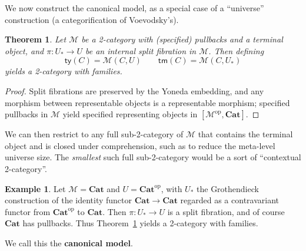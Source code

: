 \documentclass[10pt]{article}
\newtheorem{theorem}{Theorem}
\theoremstyle{definition}
\newtheorem{example}{Example}
\newcommand\op{^{\mathrm{op}}}
\newcommand\Cat{\mathbf{Cat}}
\newcommand\M{\mathcal{M}}
\newcommand\Mty{\mathsf{ty}}
\newcommand\Mtm{\mathsf{tm}}
\newcommand\Un{U}
\newcommand\Ub{U_*}
\begin{document}
We now construct the canonical model, as a special case of a ``universe'' construction (a categorification of Voevodsky's).

\begin{theorem}\label{thm:2cwf-univ}
  Let $\M$ be a 2-category with (specified) pullbacks and a terminal object, and $\pi:\Ub\to\Un$ be an internal split fibration in $\M$.
  Then defining
  \[ \Mty(C) = \M(C,\Un) \qquad \Mtm(C) = \M(C,\Ub) \]
  yields a 2-category with families.
\end{theorem}
\begin{proof}
  Split fibrations are preserved by the Yoneda embedding, and any morphism between representable objects is a representable morphism; specified pullbacks in $\M$ yield specified representing objects in $[\M\op,\Cat]$.
\end{proof}

We can then restrict to any full sub-2-category of $\M$ that contains the terminal object and is closed under comprehension, such as to reduce the meta-level universe size.
The \emph{smallest} such full sub-2-category would be a sort of ``contextual 2-category''.

\begin{example}\label{eg:canon-2cwf}
  Let $\M =\Cat$ and $\Un= \Cat\op$, with $\Ub$ the Grothendieck construction of the identity functor $\Cat \to \Cat$ regarded as a contravariant functor from $\Cat\op$ to $\Cat$.
  Then $\pi:\Ub\to\Un$ is a split fibration, and of course $\Cat$ has pullbacks.
  Thus Theorem~\ref{thm:2cwf-univ} yields a 2-category with families.


  We call this the \textbf{canonical model}.
\end{example}
\end{document}
